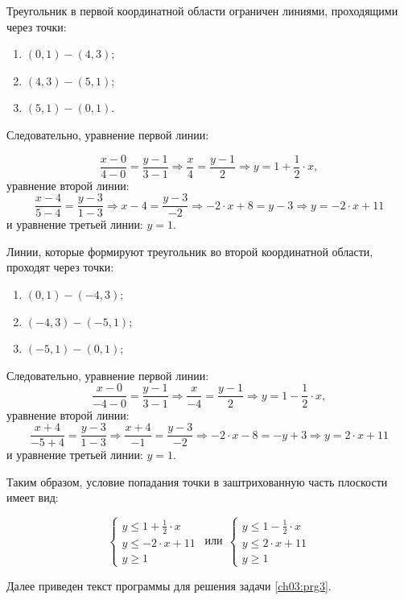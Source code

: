 Треугольник в первой координатной области ограничен линиями, проходящими через точки:

\begin{enumerate}
\item $(0, 1) - (4, 3)$;
\item $(4, 3) - (5, 1)$;
\item $(5, 1) - (0, 1)$.
\end{enumerate}
Следовательно, уравнение первой линии:

 $$\frac{x-0}{4-0}=\frac{y-1}{3-1}\Rightarrow \frac{x}{4}=\frac{y-1}{2}\Rightarrow y=1+\frac{1}{2}\cdot x,$$
уравнение второй линии:
$$
\frac{x-4}{5-4}=\frac{y-3}{1-3}\Rightarrow x-4=\frac{y-3}{-2}\Rightarrow -2\cdot x+8=y-3\Rightarrow y=-2\cdot x+11
$$
и уравнение третьей линии:  $y=1$.

Линии, которые формируют треугольник во второй координатной области, проходят через точки:

\begin{enumerate}
\item $(0, 1) - (-4, 3)$;
\item $(-4, 3) - (-5, 1)$;
\item $(-5, 1) - (0, 1)$;
\end{enumerate}
Следовательно, уравнение первой линии:
 $$\frac{x-0}{-4-0}=\frac{y-1}{3-1}\Rightarrow \frac{x}{-4}=\frac{y-1}{2}\Rightarrow y=1-\frac{1}{2}\cdot x,$$
уравнение второй линии:
$$
\frac{x+4}{-5+4}=\frac{y-3}{1-3}\Rightarrow \frac{x+4}{-1}=\frac{y-3}{-2}\Rightarrow -2\cdot x-8=-y+3\Rightarrow
y=2\cdot x+11
$$
и уравнение третьей линии:  $y=1$.

Таким образом, условие попадания точки в заштрихованную часть плоскости имеет вид:

\begin{equation*}
\left\{
\begin{array}{c}
y\leqslant 1+\frac{1}{2}\cdot x\\
y\leqslant -2\cdot x+11\\
y\geqslant 1
\end{array}%
\right.
\ \ \text{или}\ \  
\left\{
\begin{array}{c}
y\leqslant 1-\frac{1}{2}\cdot x\\
y\leqslant 2\cdot x+11\\
y\geqslant 1
\end{array}
\right. 
\end{equation*}

Далее приведен текст программы для решения задачи \ref{ch03:prg3}.

